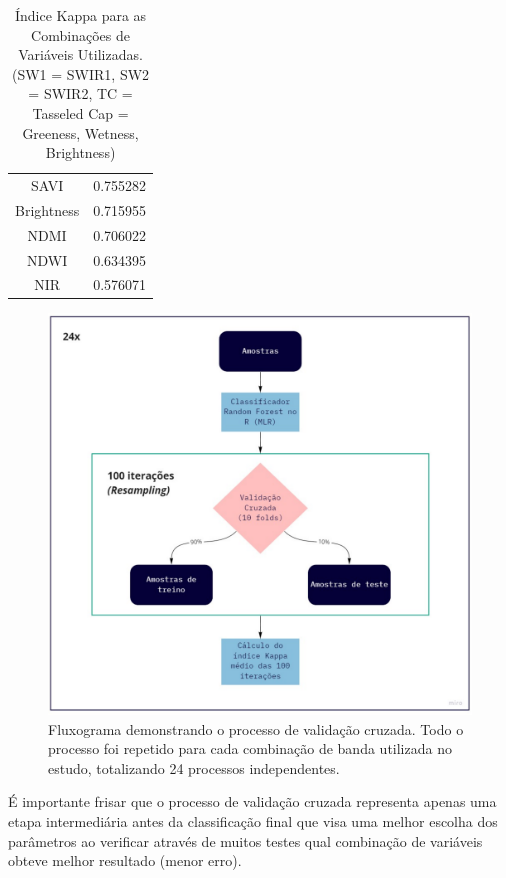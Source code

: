 \begin{table}[h!]
\begin{tabular}{|c | c|}
                                                                SAVI &  0.755282 \\
                                                          Brightness &  0.715955 \\
                                                                NDMI &  0.706022 \\
                                                                NDWI &  0.634395 \\
                                                                 NIR &  0.576071 \\
\hline
\end{tabular}
\caption{Índice Kappa para as Combinações de Variáveis Utilizadas. (SW1 = SWIR1, SW2 = SWIR2, TC = Tasseled Cap = Greeness, Wetness, Brightness)}
\label{tab:1}
\end{table}

\newpage

\begin{figure}[h!]
    \centering
    \includegraphics[scale=.4]{images/fluxograma.pdf}
    \caption{Fluxograma demonstrando o processo de validação cruzada. Todo o processo foi repetido para cada combinação de banda utilizada no estudo, totalizando 24 processos independentes.}
    \label{fig:fluxograma}
\end{figure}

É importante frisar que o processo de validação cruzada representa apenas uma etapa intermediária antes da classificação final que visa uma melhor escolha dos parâmetros ao verificar através de muitos testes qual combinação de variáveis obteve melhor resultado (menor erro).

